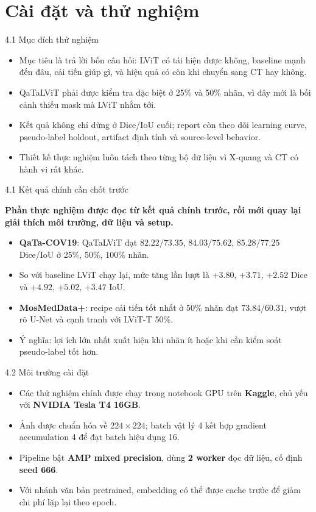 \documentclass[aspectratio=169,11pt]{beamer}
\newcommand{\reportclaim}[1]{%
  \vspace{0.08cm}
  {\large\bfseries\color{accentblue}#1\par}
  \vspace{0.06cm}
}
\newcommand{\chapterdivider}[2]{%
  \begin{frame}[plain]
    \centering
    \vspace{1.2cm}
    \makebox[\textwidth][c]{%
      \begin{beamercolorbox}[wd=0.84\textwidth,rounded=true,sep=0.42cm,center]{frametitle}
        {\LARGE\bfseries #1\par}
        \vspace{0.20cm}
        {\large #2\par}
      \end{beamercolorbox}%
    }
  \end{frame}
}
\begin{document}
\section{Cài đặt và thử nghiệm}
\chapterdivider{Chương 4}{Cài đặt và thử nghiệm}

\begin{frame}{4.1 Mục đích thử nghiệm}
  \begin{itemize}
    \item Mục tiêu là trả lời bốn câu hỏi: LViT có tái hiện được không, baseline mạnh đến đâu, cải tiến giúp gì, và hiệu quả có còn khi chuyển sang CT hay không.
    \item QaTaLViT phải được kiểm tra đặc biệt ở 25\% và 50\% nhãn, vì đây mới là bối cảnh thiếu mask mà LViT nhắm tới.
    \item Kết quả không chỉ dừng ở Dice/IoU cuối; report còn theo dõi learning curve, pseudo-label holdout, artifact định tính và source-level behavior.
    \item Thiết kế thực nghiệm luôn tách theo từng bộ dữ liệu vì X-quang và CT có hành vi rất khác.
  \end{itemize}
\end{frame}

\begin{frame}{4.1 Kết quả chính cần chốt trước}
  \reportclaim{Phần thực nghiệm được đọc từ kết quả chính trước, rồi mới quay lại giải thích môi trường, dữ liệu và setup.}
  \begin{itemize}
    \item \textbf{QaTa-COV19}: QaTaLViT đạt \(82.22/73.35\), \(84.03/75.62\), \(85.28/77.25\) Dice/IoU ở 25\%, 50\%, 100\% nhãn.
    \item So với baseline LViT chạy lại, mức tăng lần lượt là \(+3.80\), \(+3.71\), \(+2.52\) Dice và \(+4.92\), \(+5.02\), \(+3.47\) IoU.
    \item \textbf{MosMedData+}: recipe cải tiến tốt nhất ở 50\% nhãn đạt \(73.84/60.31\), vượt rõ U-Net và cạnh tranh với LViT-T 50\%.
    \item Ý nghĩa: lợi ích lớn nhất xuất hiện khi nhãn ít hoặc khi cần kiểm soát pseudo-label tốt hơn.
  \end{itemize}
\end{frame}

\begin{frame}{4.2 Môi trường cài đặt}
  \begin{itemize}
    \item Các thử nghiệm chính được chạy trong notebook GPU trên \textbf{Kaggle}, chủ yếu với \textbf{NVIDIA Tesla T4 16GB}.
    \item Ảnh được chuẩn hóa về \(224\times224\); batch vật lý 4 kết hợp gradient accumulation 4 để đạt batch hiệu dụng 16.
    \item Pipeline bật \textbf{AMP mixed precision}, dùng \textbf{2 worker} đọc dữ liệu, cố định \textbf{seed 666}.
    \item Với nhánh văn bản pretrained, embedding có thể được cache trước để giảm chi phí lặp lại theo epoch.
  \end{itemize}
\end{frame}
\end{document}
